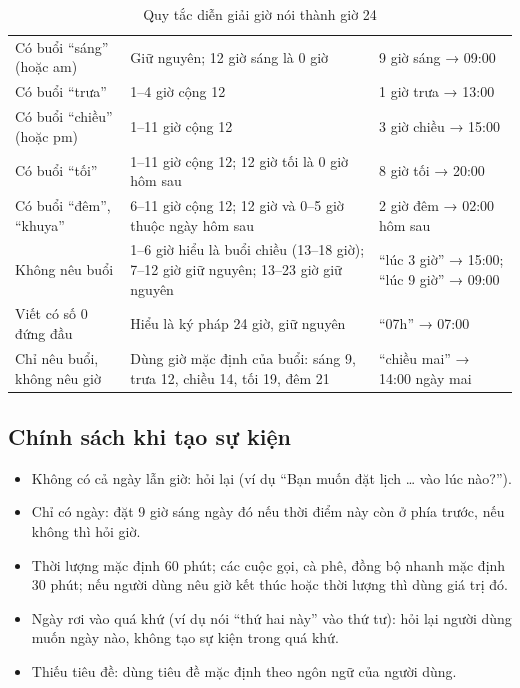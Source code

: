 \begin{table}[!htbp]
\caption{Quy tắc diễn giải giờ nói thành giờ 24}\label{tab:hours}
\bang
\begin{tabularx}{\textwidth}{|L{4.3cm}|Y|L{4.2cm}|}\hline
{} &  & \\\hline
Có buổi “sáng” (hoặc am) & Giữ nguyên; 12 giờ sáng là 0 giờ & 9 giờ sáng → 09:00\\\hline
Có buổi “trưa” & 1–4 giờ cộng 12 & 1 giờ trưa → 13:00\\\hline
Có buổi “chiều” (hoặc pm) & 1–11 giờ cộng 12 & 3 giờ chiều → 15:00\\\hline
Có buổi “tối” & 1–11 giờ cộng 12; 12 giờ tối là 0 giờ hôm sau & 8 giờ tối → 20:00\\\hline
Có buổi “đêm”, “khuya” & 6–11 giờ cộng 12; 12 giờ và 0–5 giờ thuộc ngày hôm sau & 2 giờ đêm → 02:00 hôm sau\\\hline
Không nêu buổi & 1–6 giờ hiểu là buổi chiều (13–18 giờ); 7–12 giờ giữ nguyên; 13–23 giờ giữ nguyên & “lúc 3 giờ” → 15:00; “lúc 9 giờ” → 09:00\\\hline
Viết có số 0 đứng đầu & Hiểu là ký pháp 24 giờ, giữ nguyên & “07h” → 07:00\\\hline
Chỉ nêu buổi, không nêu giờ & Dùng giờ mặc định của buổi: sáng 9, trưa 12, chiều 14, tối 19, đêm 21 & “chiều mai” → 14:00 ngày mai\\\hline
\end{tabularx}
\end{table}

\subsection{Chính sách khi tạo sự kiện}
\begin{itemize}
  \item Không có cả ngày lẫn giờ: hỏi lại (ví dụ “Bạn muốn đặt lịch \ldots{} vào lúc nào?”).
  \item Chỉ có ngày: đặt 9 giờ sáng ngày đó nếu thời điểm này còn ở phía trước, nếu không thì hỏi giờ.
  \item Thời lượng mặc định 60 phút; các cuộc gọi, cà phê, đồng bộ nhanh mặc định 30 phút; nếu người dùng nêu giờ kết thúc hoặc thời lượng thì dùng giá trị đó.
  \item Ngày rơi vào quá khứ (ví dụ nói “thứ hai này” vào thứ tư): hỏi lại người dùng muốn ngày nào, không tạo sự kiện trong quá khứ.
  \item Thiếu tiêu đề: dùng tiêu đề mặc định theo ngôn ngữ của người dùng.
\end{itemize}

